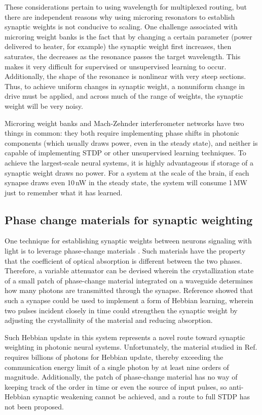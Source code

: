 \documentclass[twocolumn]{article}
\begin{document}
These considerations pertain to using wavelength for multiplexed routing, but there are independent reasons why using microring resonators to establish synaptic weights is not conducive to scaling. One challenge associated with microring weight banks is the fact that by changing a certain parameter (power delivered to heater, for example) the synaptic weight first increases, then saturates, the decreases as the resonance passes the target wavelength. This makes it very difficult for supervised or unsupervised learning to occur. Additionally, the shape of the resonance is nonlinear with very steep sections. Thus, to achieve uniform changes in synaptic weight, a nonuniform change in drive must be applied, and across much of the range of weights, the synaptic weight will be very noisy.

Microring weight banks and Mach-Zehnder interferometer networks have two things in common: they both require implementing phase shifts in photonic components (which usually draws power, even in the steady state), and neither is capable of implementing STDP or other unsupervised learning techniques. To achieve the largest-scale neural systems, it is highly advantageous if storage of a synaptic weight draws no power. For a system at the scale of the brain, if each synapse draws even 10\,nW in the steady state, the system will consume 1\,MW just to remember what it has learned. 

\subsection{Phase change materials for synaptic weighting}
One technique for establishing synaptic weights between neurons signaling with light is to leverage phase-change materials \cite{chri2017}. Such materials have the property that the coefficient of optical absorption is different between the two phases. Therefore, a variable attenuator can be devised wherein the crystallization state of a small patch of phase-change material integrated on a waveguide determines how many photons are transmitted through the synapse. Reference \cite{chri2017} showed that such a synapse could be used to implement a form of Hebbian learning, wherein two pulses incident closely in time could strengthen the synaptic weight by adjusting the crystallinity of the material and reducing absorption. 

Such Hebbian update in this system represents a novel route toward synaptic weighting in photonic neural systems. Unfortunately, the material studied in Ref.\,\cite{chri2017} requires billions of photons for Hebbian update, thereby exceeding the communication energy limit of a single photon by at least nine orders of magnitude. Additionally, the patch of phase-change material has no way of keeping track of the order in time or even the source of input pulses, so anti-Hebbian synaptic weakening cannot be achieved, and a route to full STDP has not been proposed. 
\end{document}
